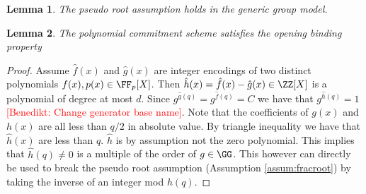 \documentclass{article}
\newtheorem{lemma}{Lemma}
\newcommand{\benedikt}[1]{{\textcolor{red}{[Benedikt: #1]}}}
\newcommand{\benedikt}[1]{}
\begin{document}
\begin{lemma}
	The pseudo root assumption holds in the generic group model.
\end{lemma}
\begin{lemma}
	The polynomial commitment scheme satisfies the opening binding property
\end{lemma}
\begin{proof}
	Assume $\hat{f}(x)$ and $\hat{g}(x)$ are integer encodings of two distinct polynomials $f(x),p(x) \in \FF_p[X]$. Then $\hat{h}(x)=\hat{f}(x)-\hat{g}(x) \in \ZZ[X]$ is a polynomial of degree at most $d$. Since $g^{\hat{g}(q)}=g^{\hat{f}(q)}=C$ we have that $g^{\hat{h}(q)}=1$\benedikt{Change generator base name}. Note that the coefficients of $g(x)$ and $h(x)$ are all less than $q/2$ in absolute value. By triangle inequality we have that $\hat{h}(x)$ are less than $q$. $\hat{h}$ is by assumption not the zero polynomial. This implies that $\hat{h}(q)\neq 0$ is a multiple of the order of $g\in \GG$. This however can directly be used to break the pseudo root assumption (Assumption \ref{assum:fracroot}) by taking the inverse of an integer mod $h(q)$.
\end{proof}
\end{document}
